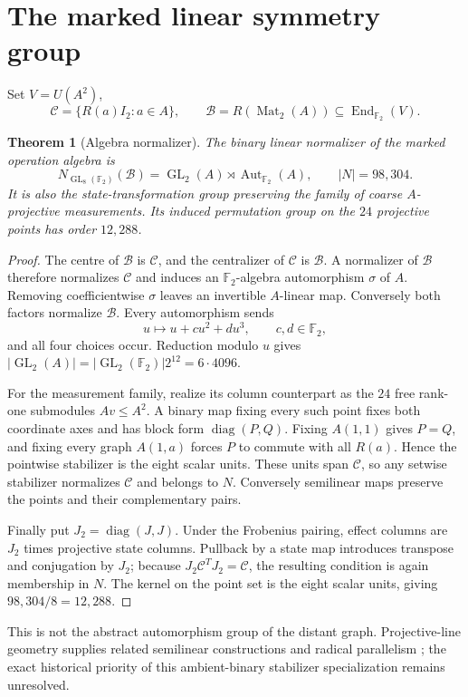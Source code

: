 \documentclass[11pt]{article}
\newtheorem{theorem}{Theorem}[section]
\theoremstyle{definition}
\theoremstyle{remark}
\newcommand{\F}{\mathbb F_2}
\newcommand{\Mat}{\operatorname{Mat}}
\newcommand{\GL}{\operatorname{GL}}
\newcommand{\Aut}{\operatorname{Aut}}
\newcommand{\diag}{\operatorname{diag}}
\begin{document}
\section{The marked linear symmetry group}

Set $V=U(A^2)$,
\[
  \mathcal C=\{R(a)I_2:a\in A\},\qquad
  \mathcal B=R(\Mat_2(A))\subseteq\operatorname{End}_{\F}(V).
\]

\begin{theorem}[Algebra normalizer]\label{thm:normalizer}
The binary linear normalizer of the marked operation algebra is
\[
  N_{\GL_8(\F)}(\mathcal B)
  =\GL_2(A)\rtimes\Aut_{\F}(A),
  \qquad |N|=98{,}304.
\]
It is also the state-transformation group preserving the family of coarse $A$-projective measurements. Its induced permutation group on the $24$ projective points has order $12{,}288$.
\end{theorem}

\begin{proof}
The centre of $\mathcal B$ is $\mathcal C$, and the centralizer of $\mathcal C$ is $\mathcal B$. A normalizer of $\mathcal B$ therefore normalizes $\mathcal C$ and induces an $\F$-algebra automorphism $\sigma$ of $A$. Removing coefficientwise $\sigma$ leaves an invertible $A$-linear map. Conversely both factors normalize $\mathcal B$. Every automorphism sends
\[
  u\longmapsto u+cu^2+du^3,\qquad c,d\in\F,
\]
and all four choices occur. Reduction modulo $u$ gives
$|\GL_2(A)|=|\GL_2(\F)|2^{12}=6\cdot4096$.

For the measurement family, realize its column counterpart as the $24$ free rank-one submodules $Av\le A^2$. A binary map fixing every such point fixes both coordinate axes and has block form $\diag(P,Q)$. Fixing $A(1,1)$ gives $P=Q$, and fixing every graph $A(1,a)$ forces $P$ to commute with all $R(a)$. Hence the pointwise stabilizer is the eight scalar units. These units span $\mathcal C$, so any setwise stabilizer normalizes $\mathcal C$ and belongs to $N$. Conversely semilinear maps preserve the points and their complementary pairs.

Finally put $J_2=\diag(J,J)$. Under the Frobenius pairing, effect columns are $J_2$ times projective state columns. Pullback by a state map introduces transpose and conjugation by $J_2$; because $J_2\mathcal C^TJ_2=\mathcal C$, the resulting condition is again membership in $N$. The kernel on the point set is the eight scalar units, giving $98{,}304/8=12{,}288$.
\end{proof}

This is not the abstract automorphism group of the distant graph. Projective-line geometry supplies related semilinear constructions and radical parallelism \cite{BH}; the exact historical priority of this ambient-binary stabilizer specialization remains unresolved.
\end{document}
